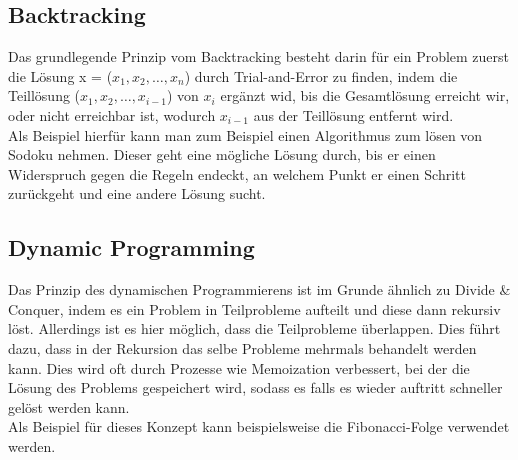 \documentclass[
../../AuD-Zusammenfassung.tex,
]
{subfiles}
\begin{document}
\subsection{Backtracking}
Das grundlegende Prinzip vom Backtracking besteht darin für ein Problem zuerst die Lösung x = ($x_1, x_2, \ldots, x_n$) durch Trial-and-Error zu finden, indem die Teillösung ($x_1, x_2, \ldots, x_{i-1}$) von $x_i$ ergänzt wid, bis die Gesamtlösung erreicht wir, oder nicht erreichbar ist, wodurch $x_{i-1}$ aus der Teillösung entfernt wird.\\
Als Beispiel hierfür kann man zum Beispiel einen Algorithmus zum lösen von Sodoku nehmen. Dieser geht eine mögliche Lösung durch, bis er einen Widerspruch gegen die Regeln endeckt, an welchem Punkt er einen Schritt zurückgeht und eine andere Lösung sucht.\\
\begin{algorithm}[H]
\end{algorithm}

\newpage
\subsection{Dynamic Programming}
Das Prinzip des dynamischen Programmierens ist im Grunde ähnlich zu Divide \& Conquer, indem es ein Problem in Teilprobleme aufteilt und diese dann rekursiv löst. Allerdings ist es hier möglich, dass die Teilprobleme überlappen. Dies führt dazu, dass in der Rekursion das selbe Probleme mehrmals behandelt werden kann. Dies wird oft durch Prozesse wie Memoization verbessert, bei der die Lösung des Problems gespeichert wird, sodass es falls es wieder auftritt schneller gelöst werden kann.\\
Als Beispiel für dieses Konzept kann beispielsweise die Fibonacci-Folge verwendet werden.\\
\end{document}
